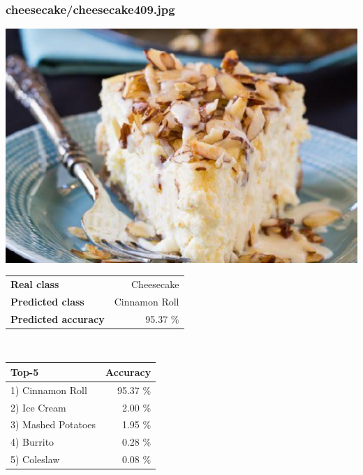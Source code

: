 \subsubsection{cheesecake/cheesecake409.jpg}

\begin{minipage}[t]{0.4\textwidth}
	\vspace{0pt}
	\includegraphics[width=\linewidth]{images/evaluation-images/cheesecake/cheesecake409.jpg}
\end{minipage}
\hfill
\begin{minipage}[t]{0.5\textwidth}
	\vspace{0pt}\raggedright
	\begin{tabularx}{\textwidth}{X r}
		\small \textbf{Real class} & \small Cheesecake\\
		\small \textbf{Predicted class} & \small Cinnamon Roll\\
		\small \textbf{Predicted accuracy} & \small 95.37 \%
    \end{tabularx}\\
    
    \vspace{6pt}
	\begin{tabularx}{\textwidth}{X r}
        \small \textbf{Top-5} & \small \textbf{Accuracy} \\
        \hline
		\small 1) Cinnamon Roll & \small 95.37 \%\\\small 2) Ice Cream & \small 2.00 \%\\\small 3) Mashed Potatoes & \small 1.95 \%\\\small 4) Burrito & \small 0.28 \%\\\small 5) Coleslaw & \small 0.08 \%
    \end{tabularx}
\end{minipage}
    
